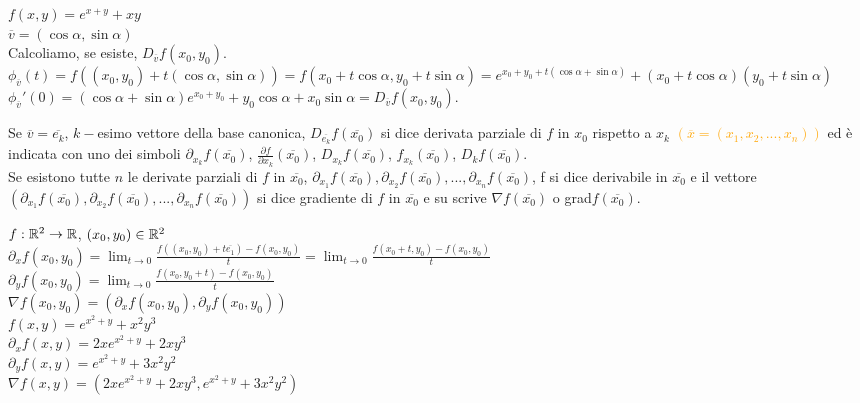 \begin{exbar}
	$f(x,y)=e^{x+y}+xy$\\
	$\overline{v}=(\cos\alpha,\sin\alpha)$\\
	Calcoliamo, se esiste, $D_{\overline{v}}f(x_0,y_0)$.\\
	$\phi_{\overline{v}}(t)=f((x_0,y_0)+t(\cos\alpha,\sin\alpha))=f(x_0+t\cos\alpha,y_0+t\sin\alpha)=e^{x_0+y_0+t(\cos\alpha+\sin\alpha)}+(x_0+t\cos\alpha)(y_0+t\sin\alpha)$\\
	$\phi_{\overline{v}}'(0)=(\cos\alpha+\sin\alpha)e^{x_0+y_0}+y_0\cos\alpha+x_0\sin\alpha=D_{\overline{v}}f(x_0,y_0)$.
\end{exbar}


\begin{definition}
	Se $\overline{v}=\overline{e_k}$, $k-$esimo vettore della base canonica, $D_{\overline{e_k}}f(\overline{x_0})$ si dice derivata parziale di $f$ in $x_0$ rispetto a $x_k$ \textcolor{orange}{$(\overline{x}=(x_1,x_2,...,x_n))$} ed è indicata con uno dei simboli $\partial_{x_k}f(\overline{x_0})$, $\frac{\partial f}{\partial x_k}(\overline{x_0})$, $D_{x_k}f(\overline{x_0})$, $f_{x_k}(\overline{x_0})$, $D_kf(\overline{x_0})$.\\
	Se esistono tutte $n$ le derivate parziali di $f$ in $\overline{x_0}$, $\partial_{x_1}f(\overline{x_0}),\partial_{x_2}f(\overline{x_0}),...,\partial_{x_n}f(\overline{x_0})$, f si dice derivabile in $\overline{x_0}$ e il vettore $(\partial_{x_1}f(\overline{x_0}),\partial_{x_2}f(\overline{x_0}),...,\partial_{x_n}f(\overline{x_0}))$ si dice gradiente di $f$ in $\overline{x_0}$ e su scrive $\nabla f(\overline{x_0})$ o grad$f(\overline{x_0})$.
\end{definition}


\begin{exbar}
	$f:\mathbb{R}^2\rightarrow\mathbb{R}$, $(x_0,y_0)\in\mathbb{R}^2$\\
	$\partial_xf(x_0,y_0)=\lim_{t\rightarrow0}\frac{f((x_0,y_0)+t\overline{e_1})-f(x_0,y_0)}{t}=\lim_{t\rightarrow0}\frac{f(x_0+t,y_0)-f(x_0,y_0)}{t}$\\
	$\partial_y f(x_0,y_0)=\lim_{t \rightarrow 0}\frac{f(x_0,y_0+t)-f(x_0,y_0)}{t}$\\
	$\nabla f(x_0,y_0)=(\partial_xf(x_0,y_0),\partial_yf(x_0,y_0))$\\
	$f(x,y)=e^{x^2+y}+x^2y^3$\\
	$\partial_xf(x,y)=2xe^{x^2+y}+2xy^3$\\
	$\partial_yf(x,y)=e^{x^2+y}+3x^2y^2$\\
	$\nabla f(x,y)=(2xe^{x^2+y}+2xy^3,e^{x^2+y}+3x^2y^2)$
\end{exbar}


